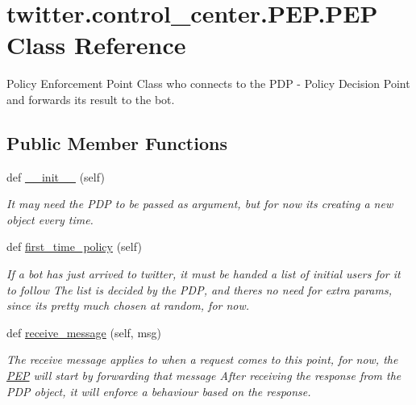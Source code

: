 \hypertarget{classtwitter_1_1control__center_1_1PEP_1_1PEP}{}\section{twitter.\+control\+\_\+center.\+P\+E\+P.\+P\+EP Class Reference}
\label{classtwitter_1_1control__center_1_1PEP_1_1PEP}


Policy Enforcement Point Class who connects to the P\+DP -\/ Policy Decision Point and forwards its result to the bot.  


\subsection*{Public Member Functions}
\begin{DoxyCompactItemize}
\item 
\mbox{\label{classtwitter_1_1control__center_1_1PEP_1_1PEP_a39f16437e59b0aba7094713042e0a6a6}} 
def \hyperlink{classtwitter_1_1control__center_1_1PEP_1_1PEP_a39f16437e59b0aba7094713042e0a6a6}{\+\_\+\+\_\+init\+\_\+\+\_\+} (self)
\begin{DoxyCompactList}\small\item\em It may need the P\+DP to be passed as argument, but for now it\textquotesingle{}s creating a new object every time. \end{DoxyCompactList}\item 
\mbox{\label{classtwitter_1_1control__center_1_1PEP_1_1PEP_af13289593fcd0c6d2e945b9431642120}} 
def \hyperlink{classtwitter_1_1control__center_1_1PEP_1_1PEP_af13289593fcd0c6d2e945b9431642120}{first\+\_\+time\+\_\+policy} (self)
\begin{DoxyCompactList}\small\item\em If a bot has just arrived to twitter, it must be handed a list of initial users for it to follow The list is decided by the P\+DP, and there\textquotesingle{}s no need for extra params, since it\textquotesingle{}s pretty much chosen at random, for now. \end{DoxyCompactList}\item 
def \hyperlink{classtwitter_1_1control__center_1_1PEP_1_1PEP_a77d6cfa9b9fed7164b8c370b7147922f}{receive\+\_\+message} (self, msg)
\begin{DoxyCompactList}\small\item\em The receive message applies to when a request comes to this point, for now, the \hyperlink{classtwitter_1_1control__center_1_1PEP_1_1PEP}{P\+EP} will start by forwarding that message After receiving the response from the P\+DP object, it will enforce a behaviour based on the response. \end{DoxyCompactList}\item 

\end{DoxyCompactItemize}
